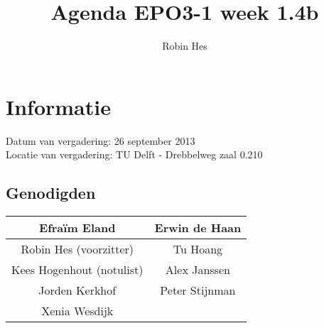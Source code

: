 \documentclass{article}
\begin{document}
\title{Agenda EPO3-1 week 1.4b}%
\author{Robin Hes}%
\maketitle

\section*{Informatie}
Datum van vergadering: 26 september 2013\\ %
Locatie van vergadering: TU Delft - Drebbelweg zaal 0.210 %
\subsection*{Genodigden}
\begin{center}
\begin{tabular}{|c |c |}
	\hline
	Efraïm Eland & Erwin de Haan \\
	\hline
	Robin Hes (voorzitter) & Tu Hoang \\
	\hline
	Kees Hogenhout (notulist) & Alex Janssen\\
	\hline
	Jorden Kerkhof & Peter Stijnman \\
	\hline
	Xenia Wesdijk & \\
	\hline
\end{tabular}
\end{center}
\end{document}

